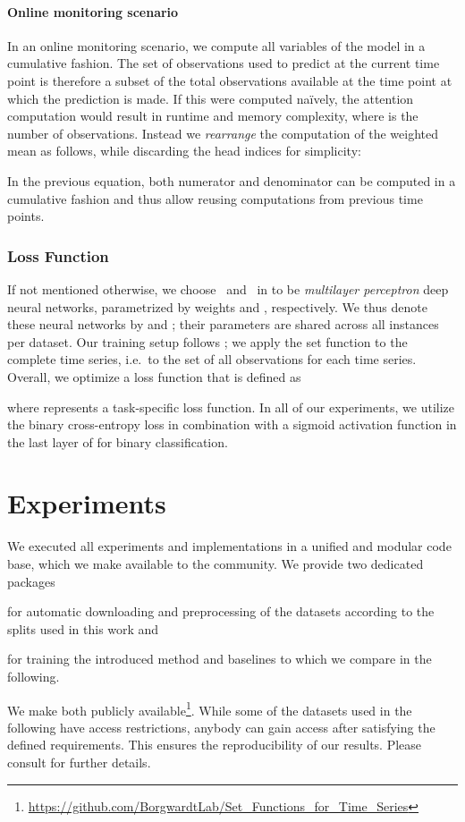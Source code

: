 \documentclass{article}
\begin{document}
\paragraph{Online monitoring scenario}
In an online monitoring scenario, we compute all variables of the model in
a cumulative fashion.  The set of observations used to predict at the current
time point is therefore a subset of the total observations available at the time
point at which the prediction is made.  If this were computed na\"ively, the
attention computation would result in  runtime and
memory complexity, where  is the number of observations.
Instead we \emph{rearrange} the computation of the weighted mean as
follows, while discarding the head indices for simplicity:

In the previous equation, both numerator and denominator can be computed
in a cumulative fashion and thus allow reusing computations from
previous time points.

\subsubsection{Loss Function}
If not mentioned otherwise, we choose~ and~ in
 to be \emph{multilayer perceptron}
deep neural networks, parametrized by weights  and ,
respectively. We thus denote these neural networks by  and
; their parameters are shared across all instances per dataset. 
Our training setup follows \citet{zaheer2017deep}; we apply the set
function to the complete time series, i.e.\ to the set of all
observations for each time series.
Overall, we optimize a loss function that is defined as

where  represents a task-specific loss function. In all of our
experiments, we utilize the binary cross-entropy loss in combination with
a sigmoid activation function in the last layer of  for binary
classification.


\section{Experiments}


We executed all experiments and implementations in a unified and modular code
base, which we make available to the community. We provide two dedicated
packages
\begin{inparaenum}[(i)]
    \item for automatic downloading and preprocessing of the datasets according to the splits
used in this work and
    \item for training the introduced method and baselines to which we compare
        in the following.
\end{inparaenum}
We make both publicly available\footnote{\url{https://github.com/BorgwardtLab/Set_Functions_for_Time_Series}}.
While some of the datasets used in the following have access restrictions,
anybody can gain access after satisfying the defined requirements.
This ensures the reproducibility of our results. Please consult
 for further details.
\end{document}
